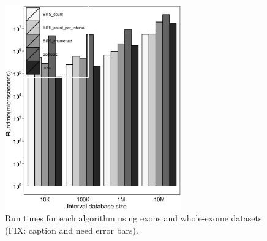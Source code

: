 \documentclass{bioinfo}
\begin{document}
	
	\begin{figure}[h]
		\centering
		\includegraphics[width=3in]{figures/exons-v-exome.eps}
		\caption[]{Run times for each algorithm using exons and whole-exome datasets (FIX: caption and need error bars).}
	\end{figure}
	
\end{document}
